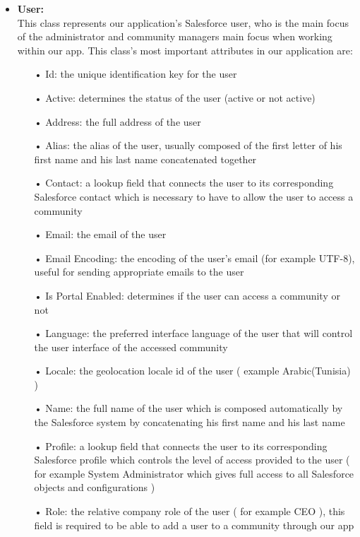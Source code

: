 \begin{itemize}
\item \textbf{User:}\\
This class represents our application's Salesforce user, who is the main focus of the administrator and community managers main focus when working within our app. This class's most important attributes in our application are:
\begin{itemize}
\item[•] Id: the unique identification key for the user 
\item[•] Active: determines the status of the user (active or not active)
\item[•] Address: the full address of the user
\item[•] Alias: the alias of the user, usually composed of the first letter of his first name and his last name concatenated together
\item[•] Contact: a lookup field that connects the user to its corresponding Salesforce contact which is necessary to have to allow the user to access a community
\item[•] Email: the email of the user
\item[•] Email Encoding: the encoding of the user's email (for example UTF-8), useful for sending appropriate emails to the user
\item[•] Is Portal Enabled: determines if the user can access a community or not
\item[•] Language: the preferred interface language of the user that will control the user interface of the accessed community
\item[•] Locale: the geolocation locale id of the user ( example Arabic(Tunisia) )
\item[•] Name: the full name of the user which is composed automatically by the Salesforce system by concatenating his first name and his last name
\item[•] Profile: a lookup field that connects the user to its corresponding Salesforce profile which controls the level of access provided to the user ( for example System Administrator which gives full access to all Salesforce objects and configurations )
\item[•] Role: the relative company role of the user ( for example CEO ), this field is required to be able to add a user to a community through our app

\end{itemize}
\end{itemize}
